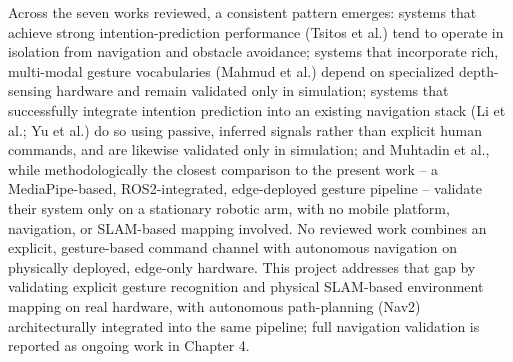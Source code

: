 Across the seven works reviewed, a consistent pattern emerges: systems that achieve
strong intention-prediction performance (Tsitos et al.) tend to operate in isolation
from navigation and obstacle avoidance; systems that incorporate rich, multi-modal
gesture vocabularies (Mahmud et al.) depend on specialized depth-sensing hardware and
remain validated only in simulation; systems that successfully integrate intention
prediction into an existing navigation stack (Li et al.; Yu et al.) do so using
passive, inferred signals rather than explicit human commands, and are likewise
validated only in simulation; and Muhtadin et al., while methodologically the closest
comparison to the present work -- a MediaPipe-based, ROS2-integrated, edge-deployed
gesture pipeline -- validate their system only on a stationary robotic arm, with no
mobile platform, navigation, or SLAM-based mapping involved. No reviewed work combines
an explicit, gesture-based command channel with autonomous navigation on physically
deployed, edge-only hardware.
This project addresses that gap by validating explicit gesture recognition and
physical SLAM-based environment mapping on real hardware, with autonomous
path-planning (Nav2) architecturally integrated into the same pipeline; full
navigation validation is reported as ongoing work in Chapter 4.


